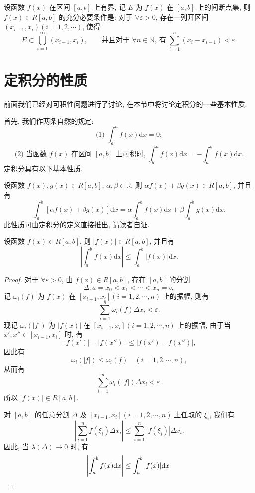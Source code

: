 \begin{theorem}[{勒贝格定理}]\label{theorem:ma-7-2-9}
设函数 $f(x)$ 在区间 $[a,b]$ 上有界, 记 $E$ 为 $f(x)$ 在 $[a,b]$ 上的间断点集, 则 $f(x)\in R[a,b]$ 的充分必要条件是: 对于 $\forall\varepsilon>0$, 存在一列开区间 $(x_{i-1},x_i)(i=1,2,\cdots)$, 使得
\[
  E\subset \bigcup_{i=1}^{\infty}(x_{i-1},x_i),
  \qquad
  \text{并且对于 } \forall n\in\mathbb N,\ \text{有 } \sum_{i=1}^n(x_i-x_{i-1})<\varepsilon.
\]
\end{theorem}


\section{定积分的性质}
\label{sec:ma-7-3}

前面我们已经对可积性问题进行了讨论, 在本节中将讨论定积分的一些基本性质.

首先, 我们作两条自然的规定:
\[
  \text{(1) }\int_a^a f(x)\mathrm dx=0;
\]
\[
  \text{(2) 当函数 } f(x) \text{ 在区间 } [a,b] \text{ 上可积时, }
  \int_b^a f(x)\mathrm dx=-\int_a^b f(x)\mathrm dx.
\]
定积分具有以下基本性质.

\begin{theorem}[{线性性质}]\label{theorem:ma-7-3-1}
设函数 $f(x),g(x)\in R[a,b]$, $\alpha,\beta\in\mathbb R$, 则 $\alpha f(x)+\beta g(x)\in R[a,b]$, 并且有
\[
  \int_a^b[\alpha f(x)+\beta g(x)]\mathrm dx
  =\alpha\int_a^b f(x)\mathrm dx+\beta\int_a^b g(x)\mathrm dx.
\]
此性质可由定积分的定义直接推出, 请读者自证.
\end{theorem}


\begin{theorem}\label{theorem:ma-7-3-2}
设函数 $f(x)\in R[a,b]$, 则 $|f(x)|\in R[a,b]$, 并且有
\[
  \left|\int_a^b f(x)\mathrm dx\right|\leq \int_a^b |f(x)|\mathrm dx.
\]
\end{theorem}


\begin{proof}
对于 $\forall\varepsilon>0$, 由 $f(x)\in R[a,b]$, 存在 $[a,b]$ 的分割
\[
  \Delta:a=x_0<x_1<\cdots<x_n=b,
\]
记 $\omega_i(f)$ 为 $f(x)$ 在 $[x_{i-1},x_i](i=1,2,\cdots,n)$ 上的振幅, 则有
\[
  \sum_{i=1}^n \omega_i(f)\Delta x_i<\varepsilon.
\]
现记 $\omega_i(|f|)$ 为 $|f(x)|$ 在 $[x_{i-1},x_i](i=1,2,\cdots,n)$ 上的振幅, 由于当 $x',x''\in[x_{i-1},x_i]$ 时, 有
\[
  \bigl||f(x')|-|f(x'')|\bigr|\leq |f(x')-f(x'')|,
\]
因此有
\[
  \omega_i(|f|)\leq \omega_i(f)\quad(i=1,2,\cdots,n),
\]
从而有
\[
  \sum_{i=1}^n \omega_i(|f|)\Delta x_i<\varepsilon.
\]
所以 $|f(x)|\in R[a,b]$.

对 $[a,b]$ 的任意分割 $\Delta$ 及 $[x_{i-1},x_i](i=1,2,\cdots,n)$ 上任取的 $\xi_i$, 我们有
\[
  \left|\sum_{i=1}^n f(\xi_i)\Delta x_i\right|
  \leq \sum_{i=1}^n |f(\xi_i)|\Delta x_i.
\]
因此, 当 $\lambda(\Delta)\to0$ 时, 有
\[
  \left|\int_a^b f(x)\mathrm dx\right|\leq \int_a^b |f(x)|\mathrm dx.
\qedhere
\]
\end{proof}


